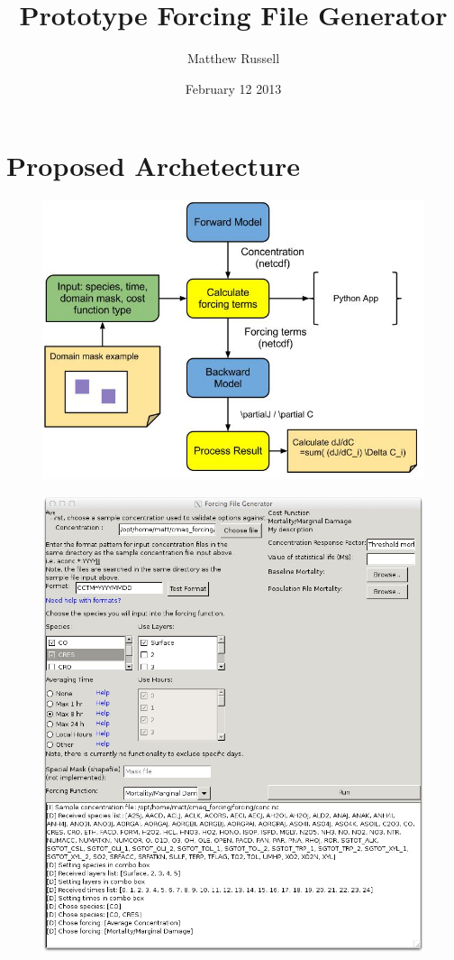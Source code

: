 \documentclass{article}
\title{Prototype Forcing File Generator}
\author{Matthew Russell}
\date{February 12 2013}
\begin{document}
\maketitle

\section{Proposed Archetecture}

\begin{figure}
	\centering
	\includegraphics{CMAQ-Adjoint-Process.jpg}
\end{figure}


\begin{figure}
	\centering
	\includegraphics{Forcing_App_Layout-filled.jpg}
\end{figure}
\end{document}
